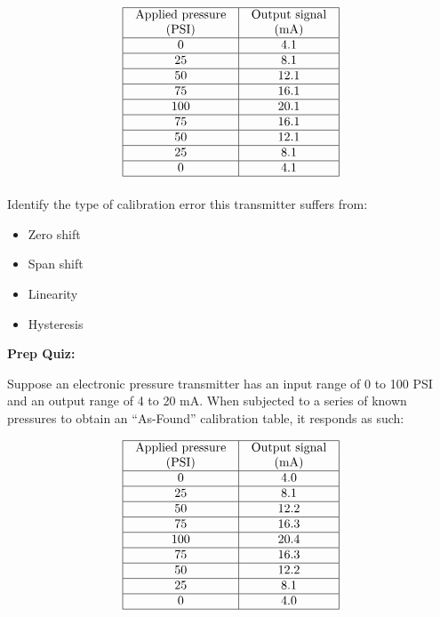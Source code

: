 $$\vbox{\offinterlineskip
\halign{\strut
\vrule \quad\hfil # \ \hfil & 
\vrule \quad\hfil # \ \hfil \vrule \cr
\noalign{\hrule}
%
Applied pressure & Output signal \cr
%
(PSI) & (mA) \cr
%
\noalign{\hrule}
%
0 & 4.1 \cr
%
\noalign{\hrule}
%
25 & 8.1 \cr
%
\noalign{\hrule}
%
50 & 12.1 \cr
%
\noalign{\hrule}
%
75 & 16.1 \cr
%
\noalign{\hrule}
%
100 & 20.1 \cr
%
\noalign{\hrule}
%
75 & 16.1 \cr
%
\noalign{\hrule}
%
50 & 12.1 \cr
%
\noalign{\hrule}
%
25 & 8.1 \cr
%
\noalign{\hrule}
%
0 & 4.1 \cr
%
\noalign{\hrule}
} %
}$$ %

\vskip 10pt

Identify the type of calibration error this transmitter suffers from:

\begin{itemize}
\item{} Zero shift
\vskip 5pt 
\item{} Span shift
\vskip 5pt 
\item{} Linearity
\vskip 5pt 
\item{} Hysteresis
\end{itemize}


\vfil \eject

\noindent
{\bf Prep Quiz:}

Suppose an electronic pressure transmitter has an input range of 0 to 100 PSI and an output range of 4 to 20 mA.  When subjected to a series of known pressures to obtain an ``As-Found'' calibration table, it responds as such:


$$\vbox{\offinterlineskip
\halign{\strut
\vrule \quad\hfil # \ \hfil & 
\vrule \quad\hfil # \ \hfil \vrule \cr
\noalign{\hrule}
%
Applied pressure & Output signal \cr
%
(PSI) & (mA) \cr
%
\noalign{\hrule}
%
0 & 4.0 \cr
%
\noalign{\hrule}
%
25 & 8.1 \cr
%
\noalign{\hrule}
%
50 & 12.2 \cr
%
\noalign{\hrule}
%
75 & 16.3 \cr
%
\noalign{\hrule}
%
100 & 20.4 \cr
%
\noalign{\hrule}
%
75 & 16.3 \cr
%
\noalign{\hrule}
%
50 & 12.2 \cr
%
\noalign{\hrule}
%
25 & 8.1 \cr
%
\noalign{\hrule}
%
0 & 4.0 \cr
%
\noalign{\hrule}
} %
}$$ %


